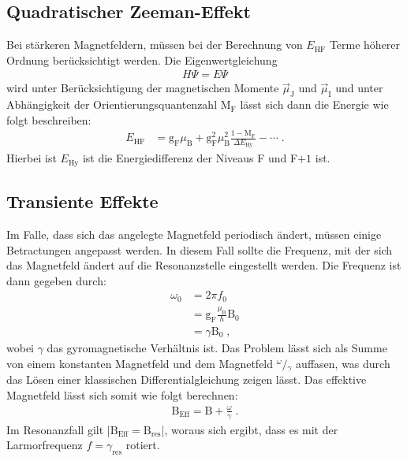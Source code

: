 \subsection{Quadratischer Zeeman-Effekt}
Bei stärkeren Magnetfeldern, müssen bei der Berechnung von $E_{\text{HF}}$ Terme höherer Ordnung berücksichtigt werden.
Die Eigenwertgleichung
\begin{align*}
    H \Psi = E \Psi
\end{align*}
wird unter Berücksichtigung der magnetischen Momente $\vec{\mu}_{\text{J}}$ und $\vec{\mu}_{\text{I}}$ und unter Abhängigkeit der Orientierungsquantenzahl $\text{M}_{\text{F}}$ lässt sich dann die Energie wie folgt beschreiben:
\begin{align*}
    E_{\text{HF}} &= \text{g}_{\text{F}} \mu_{\text{B}} + \text{g}_{\text{F}}^2 \mu_{\text{B}}^2 \frac{1- \text{M}_{\text{F}}}{\Delta E_{\text{Hy}}}- \cdots  \; .
\end{align*}
Hierbei ist $E_{\text{Hy}}$ ist die Energiedifferenz der Niveaus F und F$+1$ ist.

\subsection{Transiente Effekte}
Im Falle, dass sich das angelegte Magnetfeld periodisch ändert, müssen einige Betractungen angepasst werden.
In diesem Fall sollte die Frequenz, mit der sich das Magnetfeld ändert auf die Resonanzstelle eingestellt werden.
Die Frequenz ist dann gegeben durch:
\begin{align*}
    \omega_0 &= 2\pi f_0 \\
    &= \text{g}_{\text{F}} \frac{\mu_{\text{B}}}{h} \text{B}_0 \\
    &= \gamma \text{B}_0 \; ,
\end{align*}
wobei $\gamma$ das gyromagnetische Verhältnis ist.
Das Problem lässt sich als Summe von einem konstanten Magnetfeld und dem
Magnetfeld ${}^\omega\!/\!_\gamma$ auffasen, was durch das Lösen einer klassischen Differentialgleichung zeigen lässt.
Das effektive Magnetfeld lässt sich somit wie folgt berechnen:
\begin{align*}
    \text{B}_{\text{Eff}} = \text{B} + \frac{\omega}{\gamma} \; .
\end{align*}
Im Resonanzfall gilt |$\text{B}_{\text{Eff}} = \text{B}_{\text{res}}$|, woraus sich ergibt, dass es mit der Larmorfrequenz $f= \gamma_{\text{res}}$
rotiert.
